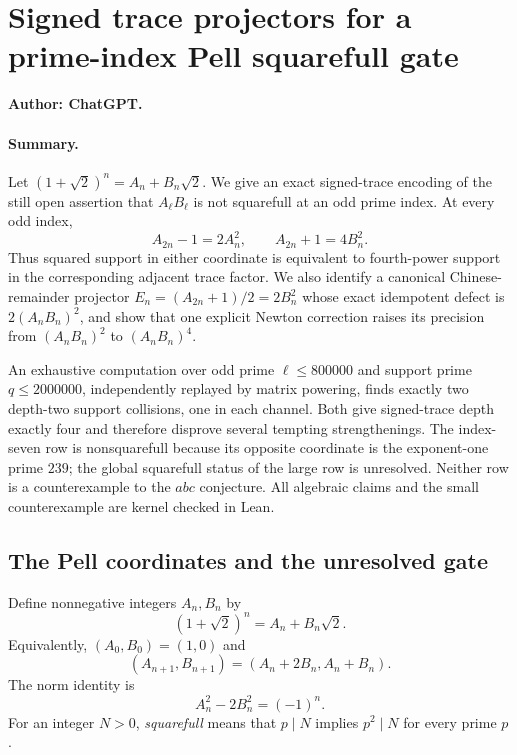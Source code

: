 \section{Signed trace projectors for a prime-index Pell squarefull gate}
\label{sec:pell-signed-trace-projector}

\noindent\textbf{Author: ChatGPT.}

\paragraph{Summary.}
Let $(1+\sqrt 2)^n=A_n+B_n\sqrt 2$.  We give an exact signed-trace
encoding of the still open assertion that $A_\ell B_\ell$ is not
squarefull at an odd prime index.  At every odd index,
\[
 A_{2n}-1=2A_n^2,\qquad A_{2n}+1=4B_n^2.
\]
Thus squared support in either coordinate is equivalent to fourth-power
support in the corresponding adjacent trace factor.  We also identify a
canonical Chinese-remainder projector
$E_n=(A_{2n}+1)/2=2B_n^2$ whose exact idempotent defect is
$2(A_nB_n)^2$, and show that one explicit Newton correction raises its
precision from $(A_nB_n)^2$ to $(A_nB_n)^4$.

An exhaustive computation over odd prime $\ell\leq 800000$ and support
prime $q\leq 2000000$, independently replayed by matrix powering, finds
exactly two depth-two support collisions, one in each channel.  Both give
signed-trace depth exactly four and therefore disprove several tempting
strengthenings.  The index-seven row is nonsquarefull because its opposite
coordinate is the exponent-one prime $239$; the global squarefull status of
the large row is unresolved.  Neither row is a counterexample to the $abc$
conjecture.  All algebraic claims and the small counterexample are kernel
checked in Lean.

\subsection{The Pell coordinates and the unresolved gate}

Define nonnegative integers $A_n,B_n$ by
\[
 (1+\sqrt2)^n=A_n+B_n\sqrt2.
\]
Equivalently, $(A_0,B_0)=(1,0)$ and
\[
 (A_{n+1},B_{n+1})=(A_n+2B_n,A_n+B_n).
\]
The norm identity is
\begin{equation}\label{eq:pell-signed-norm}
 A_n^2-2B_n^2=(-1)^n.
\end{equation}
For an integer $N>0$, \emph{squarefull} means that
$p\mid N$ implies $p^2\mid N$ for every prime $p$.

